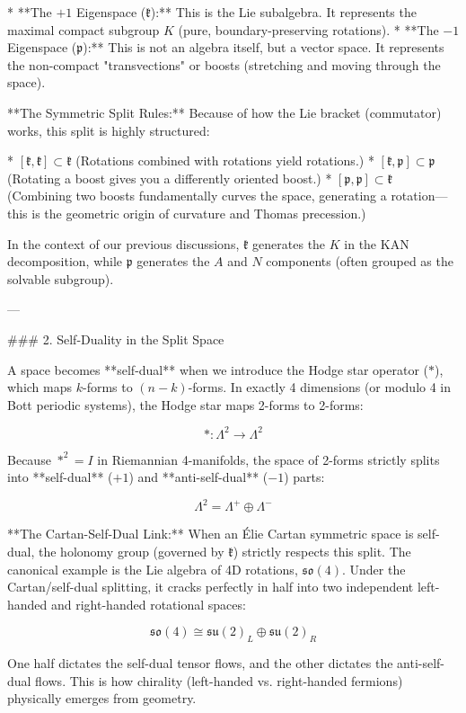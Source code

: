 * **The $+1$ Eigenspace ($\mathfrak{k}$):** This is the Lie subalgebra. It represents the maximal compact subgroup $K$ (pure, boundary-preserving rotations).
* **The $-1$ Eigenspace ($\mathfrak{p}$):** This is not an algebra itself, but a vector space. It represents the non-compact "transvections" or boosts (stretching and moving through the space).

**The Symmetric Split Rules:**
Because of how the Lie bracket (commutator) works, this split is highly structured:

* $[\mathfrak{k}, \mathfrak{k}] \subset \mathfrak{k}$ (Rotations combined with rotations yield rotations.)
* $[\mathfrak{k}, \mathfrak{p}] \subset \mathfrak{p}$ (Rotating a boost gives you a differently oriented boost.)
* $[\mathfrak{p}, \mathfrak{p}] \subset \mathfrak{k}$ (Combining two boosts fundamentally curves the space, generating a rotation—this is the geometric origin of curvature and Thomas precession.)

In the context of our previous discussions, $\mathfrak{k}$ generates the $K$ in the KAN decomposition, while $\mathfrak{p}$ generates the $A$ and $N$ components (often grouped as the solvable subgroup).

---

### 2. Self-Duality in the Split Space

A space becomes **self-dual** when we introduce the Hodge star operator ($*$), which maps $k$-forms to $(n-k)$-forms. In exactly 4 dimensions (or modulo 4 in Bott periodic systems), the Hodge star maps 2-forms to 2-forms:


$$* : \Lambda^2 \to \Lambda^2$$

Because $*^2 = I$ in Riemannian 4-manifolds, the space of 2-forms strictly splits into **self-dual** ($+1$) and **anti-self-dual** ($-1$) parts:


$$\Lambda^2 = \Lambda^+ \oplus \Lambda^-$$

**The Cartan-Self-Dual Link:**
When an Élie Cartan symmetric space is self-dual, the holonomy group (governed by $\mathfrak{k}$) strictly respects this split. The canonical example is the Lie algebra of 4D rotations, $\mathfrak{so}(4)$. Under the Cartan/self-dual splitting, it cracks perfectly in half into two independent left-handed and right-handed rotational spaces:


$$\mathfrak{so}(4) \cong \mathfrak{su}(2)_L \oplus \mathfrak{su}(2)_R$$


One half dictates the self-dual tensor flows, and the other dictates the anti-self-dual flows. This is how chirality (left-handed vs. right-handed fermions) physically emerges from geometry.

